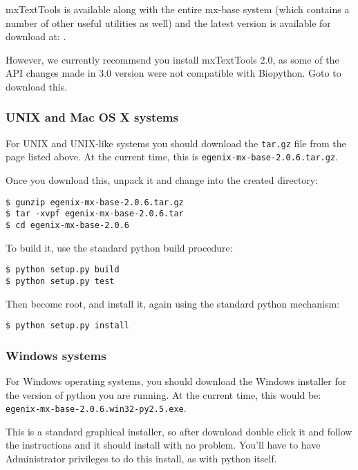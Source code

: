 \documentclass{article}
\begin{document}
mxTextTools is available along with the entire mx-base system (which
contains a number of other useful utilities as well) and the latest
version is available for download at:
.

However, we currently recommend you install mxTextTools 2.0, as some of
the API changes made in 3.0 version were not compatible with Biopython.  Goto
to download this.

\subsubsection{UNIX and Mac OS X systems}

For UNIX and UNIX-like systems you should download the \verb|tar.gz|
file from the page listed above. At the current time, this is
\verb|egenix-mx-base-2.0.6.tar.gz|.

Once you download this, unpack it and change into the created directory:

\begin{verbatim}
$ gunzip egenix-mx-base-2.0.6.tar.gz 
$ tar -xvpf egenix-mx-base-2.0.6.tar
$ cd egenix-mx-base-2.0.6
\end{verbatim}

To build it, use the standard python build procedure:

\begin{verbatim}
$ python setup.py build
$ python setup.py test
\end{verbatim}

Then become root, and install it, again using the standard python
mechanism:

\begin{verbatim}
$ python setup.py install
\end{verbatim}

\subsubsection{Windows systems}

For Windows operating systems, you should download the Windows installer
for the version of python you are running. At the current time, this
would be: \verb|egenix-mx-base-2.0.6.win32-py2.5.exe|.

This is a standard graphical installer, so after download double click
it and follow the instructions and it should install with no problem.
You'll have to have Administrator privileges to do this install, as with
python itself.
\end{document}
